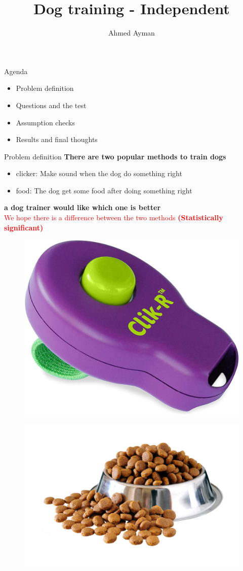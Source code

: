 \documentclass[8pt]{beamer}
\title{Dog training - Independent}
\author{Ahmed Ayman}
\begin{document}
        \maketitle
        \begin{frame}{Agenda}
            \begin{itemize}
                \item Problem definition
                \item Questions and the test
                \item Assumption checks
                \item Results and final thoughts
            \end{itemize}
        \end{frame}

        \begin{frame}{Problem definition}
            \textbf{There are two popular methods to train dogs}
            \begin{itemize}
                \item clicker: Make sound when the dog do something right
                \item food: The dog get some food after doing something right
            \end{itemize}
            \textbf{a dog trainer would like which one is better}\\
            \textcolor{red}{We hope there is a difference between the two methods \textbf{(Statistically significant)}}\\[.5cm]
            \begin{figure}
                \centering
                \includegraphics[width=.2\textwidth]{images/clicker.jpg}
                \vspace{.25cm}
            \end{figure}

            \begin{figure}
                \centering
                \includegraphics[width=.2\textwidth]{images/dry_food.jpg}
            \end{figure}
        \end{frame}
\end{document}

